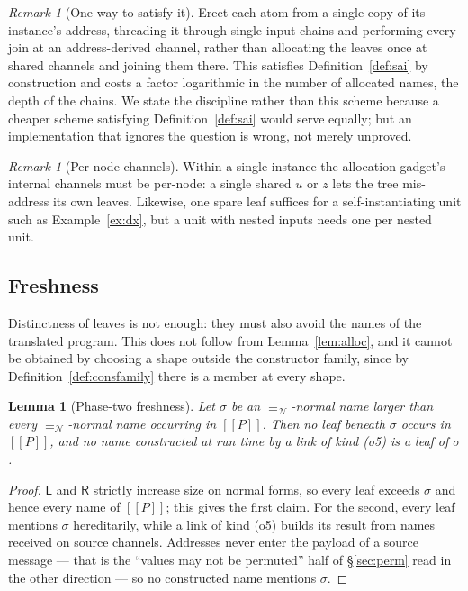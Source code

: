 \documentclass[11pt]{article}
\theoremstyle{plain}
\newtheorem{lemma}[theorem]{Lemma}
\theoremstyle{definition}
\theoremstyle{remark}
\newtheorem{remark}[theorem]{Remark}
\newcommand{\enc}[1]{[\![#1]\!]}
\newcommand{\nequiv}{\equiv_{\mathcal{N}}}
\newcommand{\Lft}{\mathsf{L}}
\newcommand{\Rgt}{\mathsf{R}}
\begin{document}
\begin{remark}[One way to satisfy it]
\label{rem:singlecopy}
Erect each atom from a single copy of its instance's address, threading it
through single-input chains and performing every join at an address-derived
channel, rather than allocating the leaves once at shared channels and
joining them there. This satisfies Definition~\ref{def:sai} by construction
and costs a factor logarithmic in the number of allocated names, the depth of
the chains. We state the discipline rather than this scheme because a cheaper
scheme satisfying Definition~\ref{def:sai} would serve equally; but an
implementation that ignores the question is wrong, not merely unproved.
\end{remark}

\begin{remark}[Per-node channels]
\label{rem:pernode}
Within a single instance the allocation gadget's internal channels must be
per-node: a single shared $u$ or $z$ lets the tree mis-address its own
leaves. Likewise, one spare leaf suffices for a self-instantiating unit such
as Example~\ref{ex:dx}, but a unit with nested inputs needs one per nested
unit.
\end{remark}

\subsection{Freshness}
\label{sec:phase2fresh}

Distinctness of leaves is not enough: they must also avoid the names of the
translated program. This does not follow from Lemma~\ref{lem:alloc}, and it
cannot be obtained by choosing a shape outside the constructor family, since
by Definition~\ref{def:consfamily} there is a member at every shape.

\begin{lemma}[Phase-two freshness]
\label{lem:fresh2}
Let $\sigma$ be an $\nequiv$-normal name larger than every $\nequiv$-normal
name occurring in $\enc{P}$. Then no leaf beneath $\sigma$ occurs in
$\enc{P}$, and no name constructed at run time by a link of kind (o5) is a
leaf of $\sigma$.
\end{lemma}

\begin{proof}
$\Lft$ and $\Rgt$ strictly increase size on normal forms, so every leaf
exceeds $\sigma$ and hence every name of $\enc{P}$; this gives the first
claim. For the second, every leaf mentions $\sigma$ hereditarily, while a
link of kind (o5) builds its result from names received on source channels.
Addresses never enter the payload of a source message --- that is the
``values may not be permuted'' half of \S\ref{sec:perm} read in the other
direction --- so no constructed name mentions $\sigma$.
\end{proof}
\end{document}
